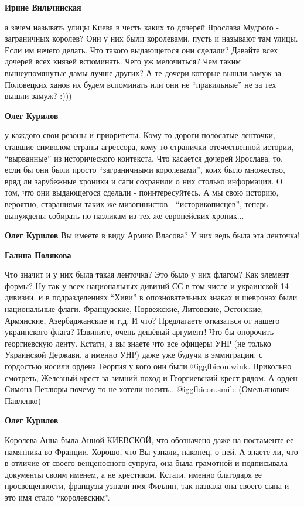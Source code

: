 \begin{itemize}
\begin{itemize}
\begin{itemize} %
\textbf{Ирине Вильчинская} 

а зачем называть улицы Киева в честь каких то дочерей Ярослава Мудрого -
заграничных королев? Они у них были королевами, пусть и называют там улицы.
Если им нечего делать. Что такого выдающегося они сделали? Давайте всех дочерей
всех князей вспоминать. Чего уж мелочиться? Чем таким вышеупомянутые дамы лучше
других? А те дочери которые вышли замуж за Половецких ханов их будем вспоминать
или они не \enquote{правильные} не за тех вышли замуж? :)))

\textbf{Олег Курилов} 

у каждого свои резоны и приоритеты. Кому-то дороги полосатые ленточки, ставшие
символом страны-агрессора, кому-то странички отечественной истории, \enquote{вырванные}
из исторического контекста. Что касается дочерей Ярослава, то, если бы они
были просто \enquote{заграничными королевами}, коих было множество, вряд ли зарубежные
хроники и саги сохранили о них столько информации. О том, что они выдающегося
сделали - поинтересуйтесь. А мы свою историю, вероятно, стараниями таких же
мизогинистов - \enquote{историкописцев}, теперь вынуждены собирать по пазликам из тех же
европейских хроник...

\textbf{Олег Курилов} Вы имеете в виду Армию Власова? У них ведь была эта ленточка!

\textbf{Галина Полякова} 

Что значит и у них была такая ленточка? Это было у них флагом? Как элемент
формы? Ну так у всех национальных дивизий СС в том числе и украинской 14
дивизии, и в подразделениях \enquote{Хиви} в опозновательных знаках и шевронах были
национальные флаги. Французские, Норвежские, Литовские, Эстонские, Армянские,
Азербаджанские и т.д. И что? Предлагаете отказаться от нашего украинского
флага? Извините, очень дешёвый аргумент! Что бы опорочить георгиевскую ленту.
Кстати, а вы знаете что все офицеры УНР (не только Украинской Держави, а именно
УНР) даже уже будучи в эммиграции, с гордостью носили ордена Георгия у кого они
были  @igg{fbicon.wink}. Прикольно смотреть, Железный крест за зимний поход и Георгиевский
крест рядом. А орден Симона Петлюры почему то не хотели носить..  @igg{fbicon.smile} 
(Омельянович-Павленко)

\textbf{Олег Курилов} 

Королева Анна была Анной КИЕВСКОЙ, что обозначено даже на постаменте ее
памятника во Франции. Хорошо, что Вы узнали, наконец, о ней. А знаете ли, что в
отличие от своего венценосного супруга, она была грамотной и подписывала
документы своим именем, а не крестиком. Кстати, именно благодаря ее
просвещенности, французы узнали имя Филлип, так назвала она своего сына и это
имя стало \enquote{королевским}. 


\end{itemize}
\end{itemize}
\end{itemize}
